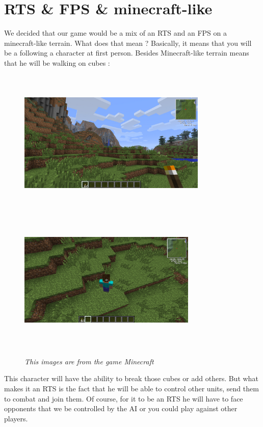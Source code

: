 \documentclass[article]{report} %
\begin{document}
						\section{RTS \& FPS \& minecraft-like}
								We decided that our game would be a mix of an \ac{RTS} and an \ac{FPS} on a minecraft-like terrain. What does that mean ? Basically, it means that you will be a following a character at first person. Besides Minecraft-like terrain means that he will be walking on cubes :\\ 
							\begin{figure}[h]
								\includegraphics[width=9cm,   height=7cm]{Images/Terrain.png}
								\includegraphics[width=8.5cm, height=7cm]{Images/Terrain2.png}
								\begin{center}\it This images are from the game Minecraft\end{center}
							\end{figure}
								
								This character will have the ability to break those cubes or add others. But what makes it an \ac{RTS} is the fact that he will be able to control other units, send them to combat and join them. Of course, for it to be an \ac{RTS} he will have to face opponents that we be controlled by the AI or you could play against other players.\\
								
\end{document}
